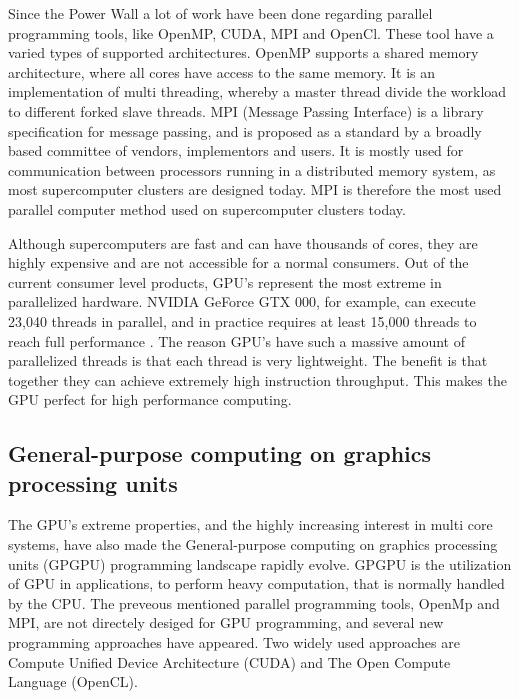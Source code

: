 Since the Power Wall a lot of work have been done regarding parallel programming tools, like OpenMP, CUDA, MPI and OpenCl. These tool have a varied types of supported architectures. OpenMP supports a shared memory architecture, where all cores have access to the same memory. It is an implementation of multi threading, whereby a master thread divide the workload to different forked slave threads. MPI (Message Passing Interface) is a library specification for message passing, and is proposed as a standard by a broadly based committee of vendors, implementors and users. It is mostly used for communication between processors running in a distributed memory system, as most supercomputer clusters are designed today. MPI is therefore the most used parallel computer method used on supercomputer clusters today.

Although supercomputers are fast and can have thousands of cores, they are highly expensive and are not accessible for a normal consumers. Out of the current consumer level products, GPU's represent the most extreme in parallelized hardware. NVIDIA GeForce GTX 000, for example, can execute 23,040 threads in parallel, and in practice requires at least 15,000 threads to reach full performance \citep{karras2012}. The reason GPU's have such a massive amount of parallelized threads is that each thread is very lightweight. The benefit is that together they can achieve extremely high instruction throughput. This makes the GPU perfect for high performance computing.

\subsection{General-purpose computing on graphics processing units} %
\label{ssub:general_purpose_computing_on_graphics_processing_units}

The GPU's extreme properties, and the highly increasing interest in multi core systems, have also made the General-purpose computing on graphics processing units (GPGPU) programming landscape rapidly evolve. GPGPU is the utilization of GPU in applications, to perform heavy computation, that is normally handled by the CPU\@. The preveous mentioned parallel programming tools, OpenMp and MPI, are not  directely desiged for GPU programming, and several new programming approaches have appeared. Two widely used approaches are Compute Unified Device Architecture (CUDA) and The Open Compute Language (OpenCL).

